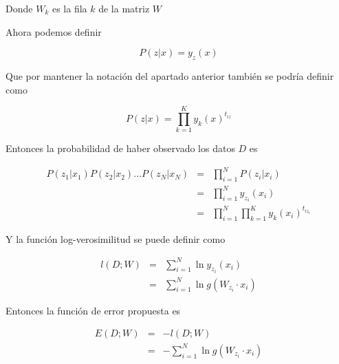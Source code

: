 \documentclass[a4paper]{article}
\begin{document}
\begin{enumerate}
{       Donde $W_k$ es la fila $k$ de la matriz $W$

       Ahora podemos definir

       \begin{equation*}
        P(z|x) = y_z(x)
       \end{equation*}

       Que por mantener la notación del apartado anterior también se podría definir como

       \begin{equation*}
        P(z|x) = \prod_{k = 1}^{K} y_k(x)^{t_{iz}}
       \end{equation*}

       Entonces la probabilidad de haber observado los datos $D$ es

       \begin{eqnarray*}
        P(z_1|x_1)P(z_2|x_2)\dots P(z_N|x_N)
        &=&
        \prod_{i = 1}^{N} P(z_i|x_i) \\
        &=&
        \prod_{i = 1}^{N} y_{z_i}(x_i) \\
        &=&
        \prod_{i = 1}^{N} \prod_{k = 1}^{K} y_k(x_i)^{t_{iz_i}}
       \end{eqnarray*}

       Y la función log-verosimilitud se puede definir como

       \begin{eqnarray*}
        l(D; W) &=&
        \sum_{i = 1}^{N}
        \ln y_{z_i}(x_i) \\
        &=&
        \sum_{i = 1}^{N}
        \ln g(W_{z_i}\cdot x_i)
       \end{eqnarray*}

       Entonces la función de error propuesta es

       \begin{eqnarray*}
        E(D;W) &=& -l(D;W) \\
        &=& -\sum_{i = 1}^{N}
        \ln g(W_{z_i}\cdot x_i)
       \end{eqnarray*}


}
\end{enumerate}
\end{document}
